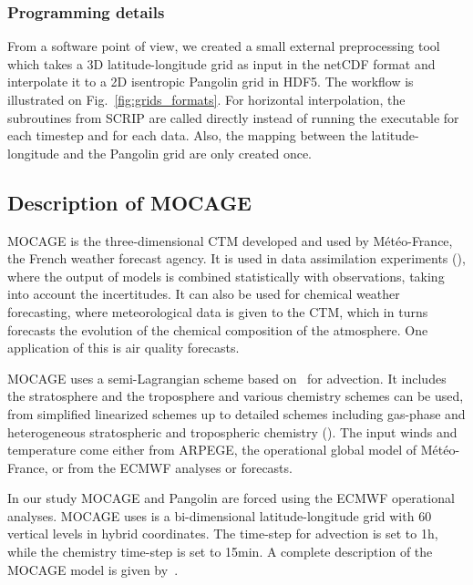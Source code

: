 \subsubsection{Programming details}
From a software point of view, we created a small external preprocessing tool which
takes a 3D latitude-longitude grid as input in the netCDF format and interpolate
it to a 2D isentropic Pangolin grid in HDF5. The workflow is illustrated on
Fig.~\ref{fig:grids_formats}. For horizontal interpolation, the
subroutines from SCRIP are called directly instead of running the executable for
each timestep and for each data. Also, the mapping between the latitude-longitude and
the Pangolin grid are only created once.

\subsection{Description of MOCAGE}
\label{subsec:mocage}
MOCAGE is the three-dimensional CTM developed and used by M\'et\'eo-France, the
French weather forecast agency.  It is used in data assimilation experiments
(\cite{Cathala2003}), where the output of models is combined statistically with
observations, taking into account the incertitudes.  It can also be used for
chemical weather forecasting, where meteorological data is given to the CTM,
which in turns forecasts the evolution of the chemical composition of the
atmosphere. One application of this is air quality forecasts.

MOCAGE uses a semi-Lagrangian scheme based on~\cite{Williamson1989} for
advection. It includes the stratosphere and the troposphere and various
chemistry schemes can be used, from simplified linearized schemes up to detailed
schemes including gas-phase and heterogeneous stratospheric and tropospheric
chemistry (\cite{Lefevre1994}). The input winds and temperature come either from
ARPEGE, the operational global model of M\'et\'eo-France, or from the
\gls{ECMWF} analyses or forecasts.

In our study MOCAGE and Pangolin are forced using the \gls{ECMWF} operational
analyses. MOCAGE uses is a bi-dimensional latitude-longitude grid with 60
vertical levels in hybrid coordinates. The time-step for advection is set to 1h,
while the chemistry time-step is set to 15min. A complete description of the
MOCAGE model is given by~\cite{Josse2004}.

